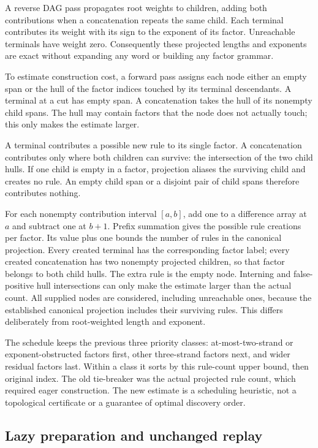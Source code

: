 A reverse DAG pass propagates root weights to children, adding both
contributions when a concatenation repeats the same child. Each terminal
contributes its weight with its sign to the exponent of its factor.
Unreachable terminals have weight zero. Consequently these projected
lengths and exponents are exact without expanding any word or building
any factor grammar.

To estimate construction cost, a forward pass assigns each node either
an empty span or the hull of the factor indices touched by its terminal
descendants. A terminal at a cut has empty span. A concatenation takes the
hull of its nonempty child spans. The hull may contain factors that the
node does not actually touch; this only makes the estimate larger.

A terminal contributes a possible new rule to its single factor. A
concatenation contributes only where both children can survive: the
intersection of the two child hulls. If one child is empty in a factor,
projection aliases the surviving child and creates no rule. An empty child
span or a disjoint pair of child spans therefore contributes nothing.

For each nonempty contribution interval $[a,b]$, add one to a difference
array at $a$ and subtract one at $b+1$. Prefix summation gives the possible
rule creations per factor. Its value plus one bounds the number of rules
in the canonical projection. Every created terminal has the corresponding
factor label; every created concatenation has two nonempty projected
children, so that factor belongs to both child hulls. The extra rule is
the empty node. Interning and false-positive hull intersections can only
make the estimate larger than the actual count. All supplied nodes are
considered, including unreachable ones, because the established canonical
projection includes their surviving rules. This differs deliberately from
root-weighted length and exponent.

The schedule keeps the previous three priority classes: at-most-two-strand
or exponent-obstructed factors first, other three-strand factors next, and
wider residual factors last. Within a class it sorts by this rule-count
upper bound, then original index. The old tie-breaker was the actual
projected rule count, which required eager construction. The new estimate
is a scheduling heuristic, not a topological certificate or a guarantee of
optimal discovery order.

\subsection{Lazy preparation and unchanged replay}

